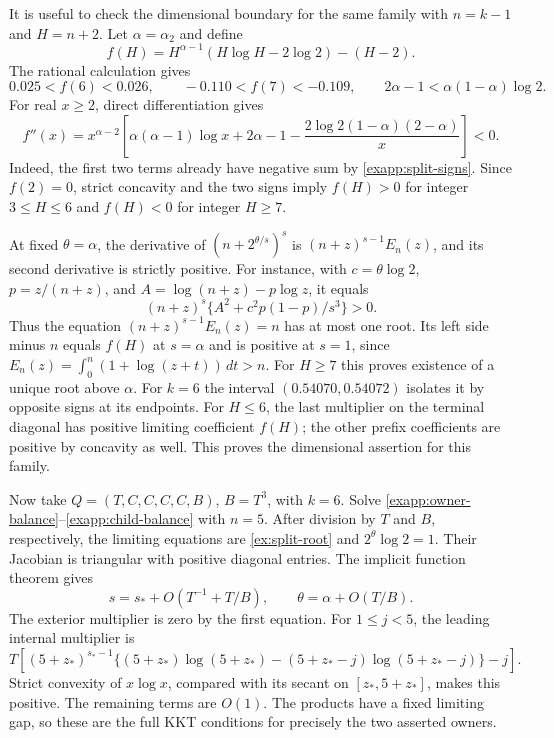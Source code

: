 It is useful to check the dimensional boundary for the same family
with \(n=k-1\) and \(H=n+2\).  Let \(\alpha=\alpha_2\) and define
\[
 f(H)=H^{\alpha-1}(H\log H-2\log2)-(H-2).
\]
The rational calculation gives
\begin{equation}
 0.025<f(6)<0.026,\qquad -0.110<f(7)<-0.109,
 \qquad 2\alpha-1<\alpha(1-\alpha)\log2.
 \label{exapp:split-signs}
\end{equation}
For real \(x\ge2\), direct differentiation gives
\[
 f''(x)=x^{\alpha-2}\left[
 \alpha(\alpha-1)\log x+2\alpha-1
 -\frac{2\log2(1-\alpha)(2-\alpha)}x\right]<0.
\]
Indeed, the first two terms already have negative sum by
\eqref{exapp:split-signs}.  Since \(f(2)=0\), strict concavity and
the two signs imply \(f(H)>0\) for integer \(3\le H\le6\) and
\(f(H)<0\) for integer \(H\ge7\).

At fixed \(\theta=\alpha\), the derivative of
\((n+2^{\theta/s})^s\) is
\((n+z)^{s-1}E_n(z)\), and its second derivative is strictly positive.
For instance, with \(c=\theta\log2\), \(p=z/(n+z)\), and
\(A=\log(n+z)-p\log z\), it equals
\[
 (n+z)^s\{A^2+c^2p(1-p)/s^3\}>0.
\]
Thus the equation \((n+z)^{s-1}E_n(z)=n\) has at most one root.
Its left side minus \(n\) equals \(f(H)\) at \(s=\alpha\)
and is positive at \(s=1\), since
\(E_n(z)=\int_0^n(1+\log(z+t))\,dt>n\).
For \(H\ge7\) this proves existence of a unique root above
\(\alpha\).  For \(k=6\) the interval
\((0.54070,0.54072)\) isolates it by opposite signs at its endpoints.
For \(H\le6\), the last multiplier on the terminal diagonal has
positive limiting coefficient \(f(H)\); the other prefix coefficients
are positive by concavity as well.  This proves the dimensional
assertion for this family.

Now take \(Q=(T,C,C,C,C,B)\), \(B=T^3\), with \(k=6\).
Solve \eqref{exapp:owner-balance}--\eqref{exapp:child-balance} with
\(n=5\).  After division by \(T\) and \(B\), respectively, the
limiting equations are \eqref{ex:split-root} and
\(2^\theta\log2=1\).  Their Jacobian is triangular with positive
diagonal entries.  The implicit function theorem gives
\begin{equation}
 s=s_*+O(T^{-1}+T/B),\qquad
 \theta=\alpha+O(T/B).
 \label{exapp:split-products}
\end{equation}
The exterior multiplier is zero by the first equation.  For
\(1\le j<5\), the leading internal multiplier is
\[
 T\left[(5+z_*)^{s_*-1}
 \{(5+z_*)\log(5+z_*)-(5+z_*-j)\log(5+z_*-j)\}-j\right].
\]
Strict convexity of \(x\log x\), compared with its secant on
\([z_*,5+z_*]\), makes this positive.  The remaining terms are
\(O(1)\).  The products have a fixed limiting gap, so these are
the full KKT conditions for precisely the two asserted owners.

